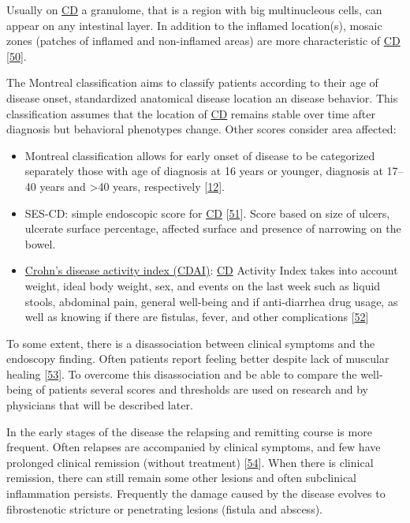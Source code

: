\documentclass[
  12pt,
  a4paper,
  twoside,
  openright]{book}
\providecommand{\tightlist}{%
  \setlength{\itemsep}{0pt}\setlength{\parskip}{0pt}}
\begin{document}
Usually on \protect\hyperlink{acronyms_CD}{CD} a granulome, that is a region with big multinucleous cells, can appear on any intestinal layer.
In addition to the inflamed location(s), mosaic zones (patches of inflamed and non-inflamed areas) are more characteristic of \protect\hyperlink{acronyms_CD}{CD} {[}\protect\hyperlink{ref-bassolasmolina2018}{50}{]}.

The Montreal classification aims to classify patients according to their age of disease onset, standardized anatomical disease location an disease behavior.
This classification assumes that the location of \protect\hyperlink{acronyms_CD}{CD} remains stable over time after diagnosis but behavioral phenotypes change.
Other scores consider area affected:

\begin{itemize}
\tightlist
\item
  Montreal classification allows for early onset of disease to be categorized separately those with age of diagnosis at 16 years or younger, diagnosis at 17--40 years and \textgreater40 years, respectively {[}\protect\hyperlink{ref-satsangi2006}{12}{]}.
\item
  SES-CD: simple endoscopic score for \protect\hyperlink{acronyms_CD}{CD} {[}\protect\hyperlink{ref-daperno2004}{51}{]}. Score based on size of ulcers, ulcerate surface percentage, affected surface and presence of narrowing on the bowel.
\item
  \protect\hyperlink{acronyms_CDAI}{Crohn's disease activity index (CDAI)}: \protect\hyperlink{acronyms_CD}{CD} Activity Index takes into account weight, ideal body weight, sex, and events on the last week such as liquid stools, abdominal pain, general well-being and if anti-diarrhea drug usage, as well as knowing if there are fistulas, fever, and other complications {[}\protect\hyperlink{ref-best1976}{52}{]}
\end{itemize}

To some extent, there is a disassociation between clinical symptoms and the endoscopy finding.
Often patients report feeling better despite lack of muscular healing {[}\protect\hyperlink{ref-bhattacharya2016}{53}{]}.
To overcome this disassociation and be able to compare the well-being of patients several scores and thresholds are used on research and by physicians that will be described later.

In the early stages of the disease the relapsing and remitting course is more frequent.
Often relapses are accompanied by clinical symptoms, and few have prolonged clinical remission (without treatment) {[}\protect\hyperlink{ref-peyrin-biroulet2010}{54}{]}.
When there is clinical remission, there can still remain some other lesions and often subclinical inflammation persists.
Frequently the damage caused by the disease evolves to fibrostenotic stricture or penetrating lesions (fistula and abscess).
\end{document}
